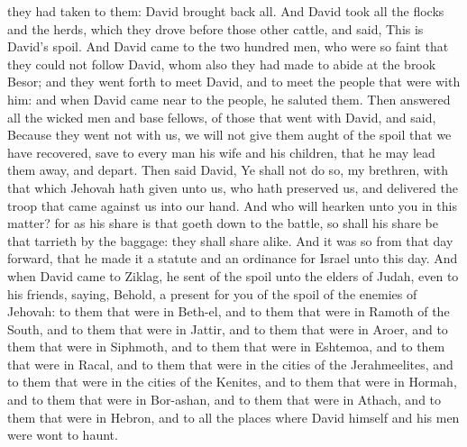they had taken to them: David brought back all. And David took all the flocks and the herds, which they drove before those other cattle, and said, This is David’s spoil.  And David came to the two hundred men, who were so faint that they could not follow David, whom also they had made to abide at the brook Besor; and they went forth to meet David, and to meet the people that were with him: and when David came near to the people, he saluted them. Then answered all the wicked men and base fellows, of those that went with David, and said, Because they went not with us, we will not give them aught of the spoil that we have recovered, save to every man his wife and his children, that he may lead them away, and depart. Then said David, Ye shall not do so, my brethren, with that which Jehovah hath given unto us, who hath preserved us, and delivered the troop that came against us into our hand. And who will hearken unto you in this matter? for as his share is that goeth down to the battle, so shall his share be that tarrieth by the baggage: they shall share alike. And it was so from that day forward, that he made it a statute and an ordinance for Israel unto this day.  And when David came to Ziklag, he sent of the spoil unto the elders of Judah, even to his friends, saying, Behold, a present for you of the spoil of the enemies of Jehovah: to them that were in Beth-el, and to them that were in Ramoth of the South, and to them that were in Jattir, and to them that were in Aroer, and to them that were in Siphmoth, and to them that were in Eshtemoa, and to them that were in Racal, and to them that were in the cities of the Jerahmeelites, and to them that were in the cities of the Kenites, and to them that were in Hormah, and to them that were in Bor-ashan, and to them that were in Athach, and to them that were in Hebron, and to all the places where David himself and his men were wont to haunt. 

